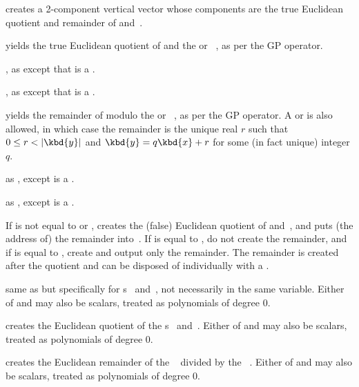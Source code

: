  creates a 2-component vertical
vector whose components are the true Euclidean quotient and remainder
of  and~.

 yields the true Euclidean
quotient of  and the  or ~, as per
the \kbd{\bs} GP operator.

, as 
except that  is a .

, as 
except that  is a .

 yields the remainder of 
modulo the  or ~, as per the \kbd{\%} GP operator.
A  or   is also allowed, in which case the
remainder is the unique real $r$ such that $0 \leq r < |\kbd{y}|$ and
$\kbd{y} = q\kbd{x} + r$ for some (in fact unique) integer $q$.

 as , except  is
a .

 as , except  is
a .

 If  is not equal to
 or , creates the (false) Euclidean quotient of
 and~, and puts (the address of) the remainder into~.
If  is equal to , do not create the remainder, and if
 is equal to , create and output only the remainder.
The remainder is created after the quotient and can be disposed of
individually with a .

 same as  but
specifically for s~ and~, not necessarily in the same
variable. Either of  and  may also be scalars, treated as
polynomials of degree $0$.

 creates the Euclidean quotient of the
s~ and~. Either of  and  may also be
scalars, treated as polynomials of degree $0$.

 creates the Euclidean remainder of the
~ divided by the ~. Either of  and
 may also be scalars, treated as polynomials of degree $0$.


